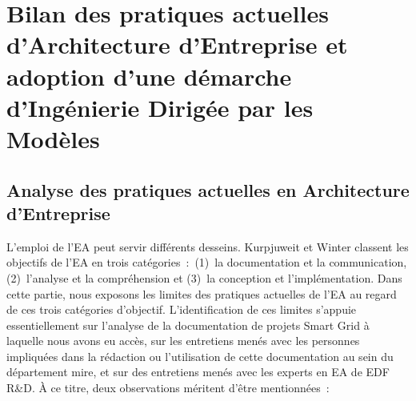 \section[Bilan des pratiques actuelles d'EA et adoption d'une démarche IDM]{Bilan
des pratiques actuelles d'Architecture d'Entreprise et adoption d'une démarche d'Ingénierie Dirigée par les Modèles}





    \subsection{Analyse des pratiques actuelles en Architecture d'Entreprise}


L'emploi de l'EA peut servir différents desseins. Kurpjuweit et Winter
\cite{kurpjuweit2007viewpoint} classent les objectifs de l'EA en trois
catégories~:~(1)~la documentation et la communication, (2)~l'analyse
et la compréhension et (3)~la conception et l'implémentation. Dans
cette partie, nous exposons les limites des pratiques actuelles de
l'EA au regard de ces trois catégories d'objectif. L'identification de
ces limites s'appuie essentiellement sur l'analyse de la documentation
de projets Smart Grid à laquelle nous avons eu accès, sur les
entretiens menés avec les personnes impliquées dans la rédaction ou
l'utilisation de cette documentation au sein du département
\gls{mire}, et sur des entretiens menés avec les experts en EA de
EDF R\&D. À ce titre, deux observations méritent d'être mentionnées~:

